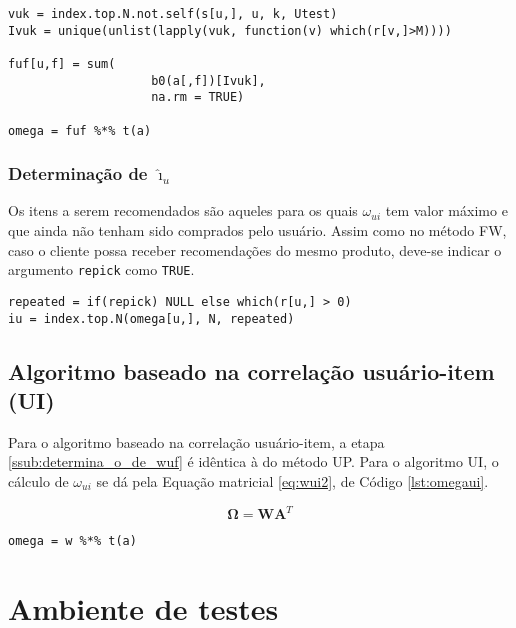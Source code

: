 \begin{lstlisting}[caption=Determinação de $\omega_{ui}$]
vuk = index.top.N.not.self(s[u,], u, k, Utest) 
Ivuk = unique(unlist(lapply(vuk, function(v) which(r[v,]>M))))

fuf[u,f] = sum(
					b0(a[,f])[Ivuk], 
					na.rm = TRUE)

omega = fuf %*% t(a)
\end{lstlisting}

\subsubsection{Determinação de $\hat{\imath}_u$} %
\label{ssub:determina_o_de_}

Os itens a serem recomendados são aqueles para os quais $\omega_{ui}$ tem valor máximo e que ainda não tenham sido comprados pelo usuário. Assim como no método FW, caso o cliente possa receber recomendações do mesmo produto, deve-se indicar o argumento \texttt{repick} como \texttt{TRUE}.

\begin{lstlisting}[caption=Determinação de $\hat{\imath}_u$]
repeated = if(repick) NULL else which(r[u,] > 0)
iu = index.top.N(omega[u,], N, repeated)
\end{lstlisting}

\subsection{Algoritmo baseado na correlação usuário-item (UI)} %
\label{sub:algoritmo_baseado_na_correla_o_usu_rio_item_ui_}

Para o algoritmo baseado na correlação usuário-item, a etapa \ref{ssub:determina_o_de_wuf} é idêntica à do método UP. Para o algoritmo UI, o cálculo de $\omega_{ui}$ se dá pela Equação matricial \ref{eq:wui2}, de Código \ref{lst:omegaui}.

\begin{equation}
\label{eq:wui2}
\mathbf{\Omega} = \mathbf{W} \mathbf{A}^T
\end{equation}

\begin{lstlisting}[caption=Determinação de $\omega_{ui}$,label=lst:omegaui]
omega = w %*% t(a)  
\end{lstlisting}

\section{Ambiente de testes} %
\label{sec:ambiente_de_testes}

